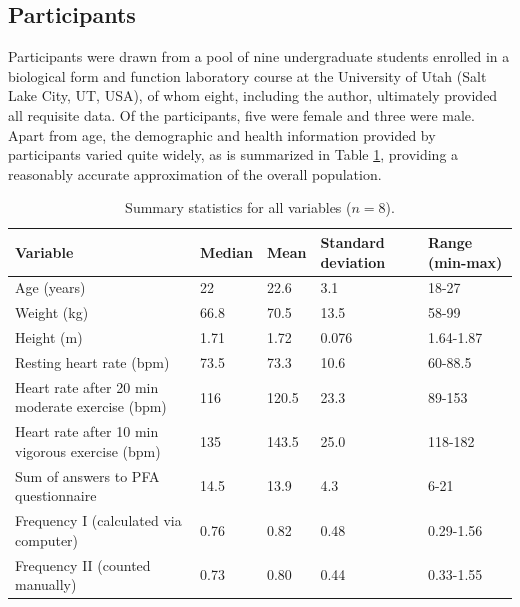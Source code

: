 \documentclass{article}
\begin{document}
\subsection{Participants}
Participants were drawn from a pool of nine undergraduate students enrolled in a biological form and function laboratory course at the University of Utah (Salt Lake City, UT, USA), of whom eight, including the author, ultimately provided all requisite data. Of the participants, five were female and three were male. Apart from age, the demographic and health information provided by participants varied quite widely, as is summarized in Table \ref{fig:summary}, providing a reasonably accurate approximation of the overall population. 
\begin{table}[h!]
\centering
\begin{tabularx}{\linewidth}{Xllll}
\toprule
Variable                                        & Median & Mean  & Standard deviation & Range (min-max) \\ \midrule
Age (years)                                     & 22     & 22.6  & 3.1                & 18-27           \\
Weight (kg)                                     & 66.8   & 70.5  & 13.5               & 58-99           \\
Height (m)                                      & 1.71   & 1.72  & 0.076              & 1.64-1.87       \\
Resting heart rate (bpm)                        & 73.5   & 73.3  & 10.6               & 60-88.5         \\
Heart rate after 20 min moderate exercise (bpm) & 116    & 120.5 & 23.3               & 89-153          \\
Heart rate after 10 min vigorous exercise (bpm) & 135    & 143.5 & 25.0               & 118-182         \\
Sum of answers to PFA questionnaire             & 14.5   & 13.9  & 4.3                & 6-21            \\
Frequency I (calculated via computer)                      & 0.76   & 0.82  & 0.48               & 0.29-1.56       \\
Frequency II (counted manually)                        & 0.73   & 0.80  & 0.44               & 0.33-1.55       \\ \bottomrule
\end{tabularx}
	\caption{Summary statistics for all variables ($n = 8$).}
	\label{fig:summary}
\end{table}
\end{document}
